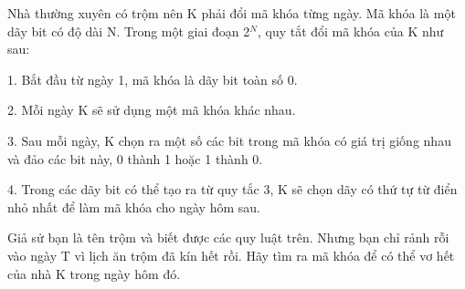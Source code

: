 Nhà thường xuyên có trộm nên K phải đổi mã khóa từng ngày. Mã khóa là một dãy bit có độ dài N. Trong một giai đoạn 2$^N$, quy tắt đổi mã khóa của K như sau:

1. Bắt đầu từ ngày 1, mã khóa là dãy bit toàn số 0.

2. Mỗi ngày K sẽ sử dụng một mã khóa khác nhau.

3. Sau mỗi ngày, K chọn ra một số các bit trong mã khóa có giá trị giống nhau và đảo các bit này, 0 thành 1 hoặc 1 thành 0.

4. Trong các dãy bit có thể tạo ra từ quy tắc 3, K sẽ chọn dãy có thứ tự từ điển nhỏ nhất để làm mã khóa cho ngày hôm sau.

Giả sử bạn là tên trộm và biết được các quy luật trên. Nhưng bạn chỉ rảnh rỗi vào ngày T vì lịch ăn trộm đã kín hết rồi. Hãy tìm ra mã khóa để có thể vơ hết của nhà K trong ngày hôm đó.